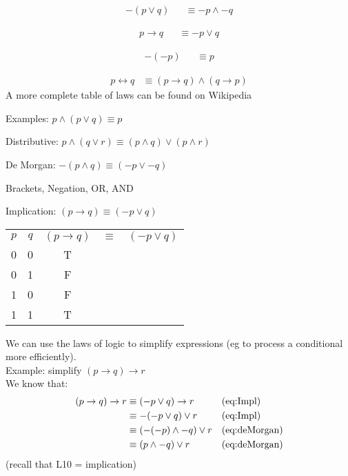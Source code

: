 \begin{align}
  -(p \lor q) &
    & \equiv -p \land -q
  \label{eq:deMorgan2}
\end{align}

\begin{align}
  p \to q &
    & \equiv -p \lor q
  \label{eq:Impl}
\end{align}

\begin{align}
  -(-p) &
    & \equiv p
  \label{eq:2Neg}
\end{align}

\begin{align}
  p \leftrightarrow q
    & \equiv (p \to q) \land (q \to p)
  \label{eq:Equiv}
\end{align}
A more complete table of laws can be found on Wikipedia 


Examples:
$ p \land (p \lor q) \equiv p$

Distributive:
$ p \land (q \lor r) \equiv (p \land q) \lor (p \land r)$

De Morgan:
$ -(p \land q) \equiv (-p \lor -q)$
  
Brackets, Negation, OR, AND

Implication:
$ (p \to q) \equiv (-p \lor q)$
\begin{table}[!htb]
\label{tab:TruthTableTautology}
\begin{tabularx}{\linewidth}{| c | c | c | c | c |} \hline
  $p$ & $q$ & $(p \to q)$ & $\equiv$ & $(-p \lor q)$ \\
  0   &   0 &           T &          & \\
  0   &   1 &           F &          & \\
  1   &   0 &           F &          & \\
  1   &   1 &           T &          & \\
\end{tabularx}
\end{table}

We can use the laws of logic to simplify expressions (eg to process a
conditional more efficiently). \\

Example: simplify $(p \to q) \to r$ \\
We know that:
\begin{align}
  (p \to q) \to r
    & \equiv (-p \lor q) \to r       && \text{(eq:Impl)}\\
    & \equiv -(-p \lor q) \lor r     && \text{(eq:Impl)}\\
    & \equiv (-(-p) \land -q) \lor r && \text{(eq:deMorgan)}\\
    & \equiv (p \land -q) \lor r     && \text{(eq:deMorgan)}\\
\end{align}
(recall that L10 = implication)

